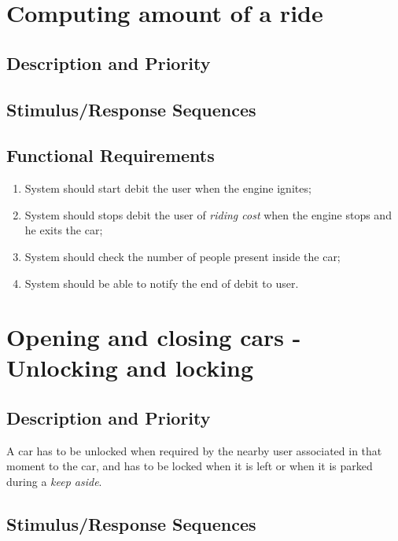 \documentclass{scrreprt}
\begin{document}
\section{Computing amount of a ride}
\subsection{Description and Priority}

\subsection{Stimulus/Response Sequences}
\subsection{Functional Requirements}
\begin{enumerate}[label=R\arabic*.,resume]
\item System should start debit the user when the engine ignites;
\item System should stops debit the user of \emph{riding cost} when the engine stops and he exits the car;
\item System should check the number of people present inside the car;
\item System should be able to notify the end of debit to user.

\end{enumerate}

\section{Opening and closing cars - Unlocking and locking}
\subsection{Description and Priority}
A car has to be unlocked when required by the nearby user associated in that moment to the car, and has to be locked when it is left or when it is parked during a \emph{keep aside}.

\subsection{Stimulus/Response Sequences}
\end{document}
